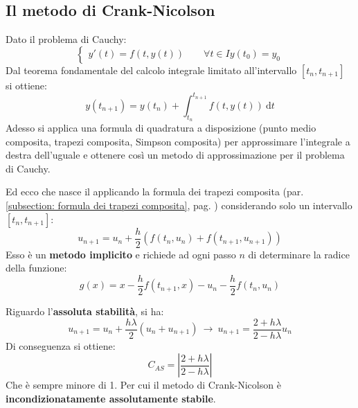\subsection{Il metodo di Crank-Nicolson}

Dato il problema di Cauchy:
\begin{equation*}
	\begin{cases}
		y'\left(t\right) = f\left(t, y\left(t\right)\right) \hspace{2em} \forall t \in I
		y\left(t_{0}\right) = y_{0}
	\end{cases}
\end{equation*}
Dal teorema fondamentale del calcolo integrale limitato all'intervallo $\left[t_{n}, t_{n+1}\right]$ si ottiene:
\begin{equation*}
	y\left(t_{n+1}\right) = y\left(t_{n}\right) + \displaystyle\int_{t_{n}}^{t_{n+1}} f\left(t, y\left(t\right)\right) \: \mathrm{d}t
\end{equation*}
Adesso si applica una formula di quadratura a disposizione (punto medio composita, trapezi composita, Simpson composita) per approssimare l'integrale a destra dell'uguale e ottenere così un metodo di approssimazione per il problema di Cauchy.

\highspace
Ed ecco che nasce il  applicando la formula dei trapezi composita (par. \ref{subsection: formula dei trapezi composita}, pag. \pageref{subsection: formula dei trapezi composita}) considerando solo un intervallo $\left[t_{n}, t_{n+1}\right]$:
\begin{equation}
	u_{n+1} = u_{n} + \dfrac{h}{2}\left(f\left(t_{n}, u_{n}\right) + f\left(t_{n+1}, u_{n+1}\right)\right)
\end{equation}
Esso è un \textbf{metodo implicito} e richiede ad ogni passo $n$ di determinare la radice della funzione:
\begin{equation*}
	g\left(x\right) = x - \dfrac{h}{2} f\left(t_{n+1}, x\right) - u_{n} - \dfrac{h}{2} f\left(t_{n}, u_{n}\right)
\end{equation*}

\highspace
Riguardo l'\textbf{assoluta stabilità}, si ha:
\begin{equation*}
	u_{n+1} = u_{n} + \dfrac{h \lambda}{2}\left(u_{n} + u_{n+1}\right) \: \rightarrow \: u_{n+1} = \dfrac{2+h\lambda}{2-h\lambda} u_{n}
\end{equation*}
Di conseguenza si ottiene:
\begin{equation*}
	C_{AS} = \left|\dfrac{2+h\lambda}{2-h\lambda}\right|
\end{equation*}
Che è sempre minore di 1. Per cui il metodo di Crank-Nicolson è \textbf{incondizionatamente assolutamente stabile}.